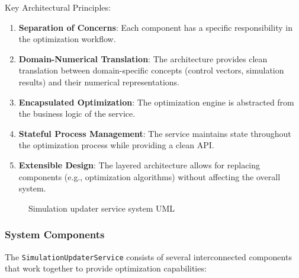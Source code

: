 Key Architectural Principles:
\begin{enumerate}
	\item \textbf{Separation of Concerns}: Each component has a specific responsibility in the optimization workflow.

	\item \textbf{Domain-Numerical Translation}: The architecture provides clean translation between domain-specific concepts (control vectors, simulation results) and their numerical representations.

	\item \textbf{Encapsulated Optimization}: The optimization engine is abstracted from the business logic of the service.

	\item \textbf{Stateful Process Management}: The service maintains state throughout the optimization process while providing a clean API.

	\item \textbf{Extensible Design}: The layered architecture allows for replacing components (e.g., optimization algorithms) without affecting the overall system.
\end{enumerate}

\begin{figure}[H]
	\centering
	
	\caption{Simulation updater service system UML}
	\label{fig:SolutionUpdaterServiceUML}
\end{figure}

\subsubsection{System Components}

The \texttt{SimulationUpdaterService} consists of several interconnected components that work together to provide optimization capabilities:

